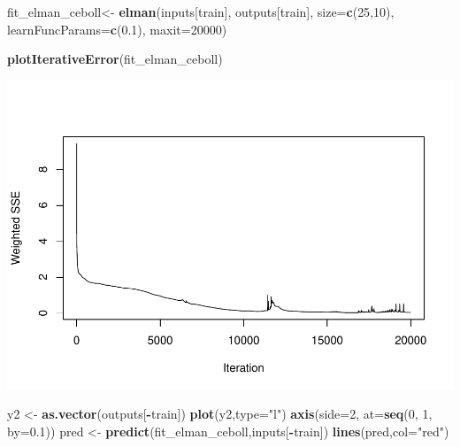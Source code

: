 \documentclass[
]{book}
\newenvironment{Shaded}{\begin{snugshade}}{\end{snugshade}}
\newcommand{\AttributeTok}[1]{\textcolor[rgb]{0.13,0.29,0.53}{#1}}
\newcommand{\DecValTok}[1]{\textcolor[rgb]{0.00,0.00,0.81}{#1}}
\newcommand{\FloatTok}[1]{\textcolor[rgb]{0.00,0.00,0.81}{#1}}
\newcommand{\FunctionTok}[1]{\textcolor[rgb]{0.13,0.29,0.53}{\textbf{#1}}}
\newcommand{\NormalTok}[1]{#1}
\newcommand{\OtherTok}[1]{\textcolor[rgb]{0.56,0.35,0.01}{#1}}
\newcommand{\SpecialCharTok}[1]{\textcolor[rgb]{0.81,0.36,0.00}{\textbf{#1}}}
\newcommand{\StringTok}[1]{\textcolor[rgb]{0.31,0.60,0.02}{#1}}
\begin{document}
\begin{Shaded}
\begin{Highlighting}[]
\NormalTok{fit\_elman\_ceboll}\OtherTok{\textless{}{-}} \FunctionTok{elman}\NormalTok{(inputs[train],}
\NormalTok{                       outputs[train],}
                       \AttributeTok{size=}\FunctionTok{c}\NormalTok{(}\DecValTok{25}\NormalTok{,}\DecValTok{10}\NormalTok{),}
                       \AttributeTok{learnFuncParams=}\FunctionTok{c}\NormalTok{(}\FloatTok{0.1}\NormalTok{),}
                       \AttributeTok{maxit=}\DecValTok{20000}\NormalTok{)}


\FunctionTok{plotIterativeError}\NormalTok{(fit\_elman\_ceboll)}
\end{Highlighting}
\end{Shaded}

\includegraphics{bookdown-demo_files/figure-latex/unnamed-chunk-190-1.pdf}

\begin{Shaded}
\begin{Highlighting}[]
\NormalTok{y2 }\OtherTok{\textless{}{-}} \FunctionTok{as.vector}\NormalTok{(outputs[}\SpecialCharTok{{-}}\NormalTok{train])}
\FunctionTok{plot}\NormalTok{(y2,}\AttributeTok{type=}\StringTok{"l"}\NormalTok{)}
\FunctionTok{axis}\NormalTok{(}\AttributeTok{side=}\DecValTok{2}\NormalTok{, }\AttributeTok{at=}\FunctionTok{seq}\NormalTok{(}\DecValTok{0}\NormalTok{, }\DecValTok{1}\NormalTok{, }\AttributeTok{by=}\FloatTok{0.1}\NormalTok{))}
\NormalTok{pred }\OtherTok{\textless{}{-}} \FunctionTok{predict}\NormalTok{(fit\_elman\_ceboll,inputs[}\SpecialCharTok{{-}}\NormalTok{train])}
\FunctionTok{lines}\NormalTok{(pred,}\AttributeTok{col=}\StringTok{"red"}\NormalTok{)}
\end{Highlighting}
\end{Shaded}
\end{document}

